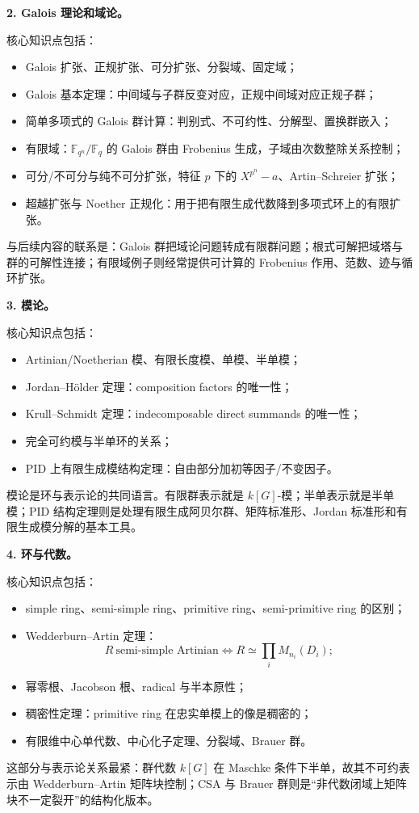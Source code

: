 \documentclass[a4paper]{ctexart}
\theoremstyle{definition}
\theoremstyle{analysis}
\theoremstyle{plain}
\begin{document}
\medskip
\textbf{2. Galois 理论和域论。}

核心知识点包括：
\begin{itemize}
  \item Galois 扩张、正规扩张、可分扩张、分裂域、固定域；
  \item Galois 基本定理：中间域与子群反变对应，正规中间域对应正规子群；
  \item 简单多项式的 Galois 群计算：判别式、不可约性、分解型、置换群嵌入；
  \item 有限域：\(\mathbb F_{q^n}/\mathbb F_q\) 的 Galois 群由 Frobenius 生成，子域由次数整除关系控制；
  \item 可分/不可分与纯不可分扩张，特征 \(p\) 下的 \(X^{p^n}-a\)、Artin--Schreier 扩张；
  \item 超越扩张与 Noether 正规化：用于把有限生成代数降到多项式环上的有限扩张。
\end{itemize}
与后续内容的联系是：Galois 群把域论问题转成有限群问题；根式可解把域塔与群的可解性连接；有限域例子则经常提供可计算的 Frobenius 作用、范数、迹与循环扩张。

\medskip
\textbf{3. 模论。}

核心知识点包括：
\begin{itemize}
  \item Artinian/Noetherian 模、有限长度模、单模、半单模；
  \item Jordan--Hölder 定理：composition factors 的唯一性；
  \item Krull--Schmidt 定理：indecomposable direct summands 的唯一性；
  \item 完全可约模与半单环的关系；
  \item PID 上有限生成模结构定理：自由部分加初等因子/不变因子。
\end{itemize}
模论是环与表示论的共同语言。有限群表示就是 \(k[G]\)-模；半单表示就是半单模；PID 结构定理则是处理有限生成阿贝尔群、矩阵标准形、Jordan 标准形和有限生成模分解的基本工具。

\medskip
\textbf{4. 环与代数。}

核心知识点包括：
\begin{itemize}
  \item simple ring、semi-simple ring、primitive ring、semi-primitive ring 的区别；
  \item Wedderburn--Artin 定理：
  \[
    R\ \text{semi-simple Artinian}
    \iff
    R\simeq \prod_i M_{n_i}(D_i);
  \]
  \item 幂零根、Jacobson 根、radical 与半本原性；
  \item 稠密性定理：primitive ring 在忠实单模上的像是稠密的；
  \item 有限维中心单代数、中心化子定理、分裂域、Brauer 群。
\end{itemize}
这部分与表示论关系最紧：群代数 \(k[G]\) 在 Maschke 条件下半单，故其不可约表示由 Wedderburn--Artin 矩阵块控制；CSA 与 Brauer 群则是“非代数闭域上矩阵块不一定裂开”的结构化版本。
\end{document}
